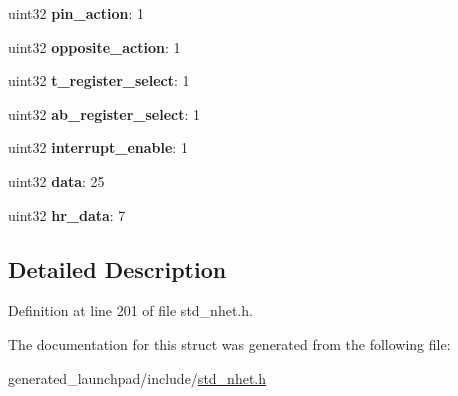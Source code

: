 \begin{DoxyCompactItemize}
uint32 {\bfseries pin\+\_\+action}\+: 1
\item 
\mbox{\label{structmcmp__format_a136b2ed84358f202ab0d0102b073a587}} 
uint32 {\bfseries opposite\+\_\+action}\+: 1
\item 
\mbox{\label{structmcmp__format_a11765ced0f9c399e6a699b0031982bfa}} 
uint32 {\bfseries t\+\_\+register\+\_\+select}\+: 1
\item 
\mbox{\label{structmcmp__format_aab949bd1ed6945b468c14d0edfe6a9f7}} 
uint32 {\bfseries ab\+\_\+register\+\_\+select}\+: 1
\item 
\mbox{\label{structmcmp__format_a163853f5618d6108ea81610519f85565}} 
uint32 {\bfseries interrupt\+\_\+enable}\+: 1
\item 
\mbox{\label{structmcmp__format_a1f3cbb284c9bb57338edf8a912666ab5}} 
uint32 {\bfseries data}\+: 25
\item 
\mbox{\label{structmcmp__format_aee2d5bf95103a69cb2ed7fcb72e4a63a}} 
uint32 {\bfseries hr\+\_\+data}\+: 7
\end{DoxyCompactItemize}


\subsection{Detailed Description}


Definition at line 201 of file std\+\_\+nhet.\+h.



The documentation for this struct was generated from the following file\+:\begin{DoxyCompactItemize}
\item 
generated\+\_\+launchpad/include/\mbox{\hyperlink{std__nhet_8h}{std\+\_\+nhet.\+h}}\end{DoxyCompactItemize}
